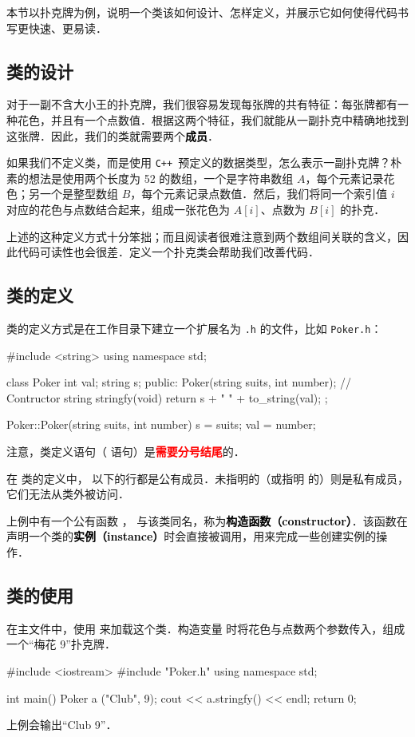 \documentclass[a4paper, zihao=-4, linespread=1]{ctexrep}
\newcommand\cpp{\texttt{C++}}
\newcommand\hlt[1]{\textcolor{red}{\bfseries #1}}
\newcommand\cppkw[1]{\textcolor{black}{\bfseries #1}}
\begin{document}
本节以扑克牌为例，说明一个类该如何设计、怎样定义，并展示它如何使得代码书写更快速、更易读．

\subsection{类的设计}
对于一副不含大小王的扑克牌，我们很容易发现每张牌的共有特征：每张牌都有一种花色，并且有一个点数值．根据这两个特征，我们就能从一副扑克中精确地找到这张牌．因此，我们的类就需要两个\cppkw{成员}．

如果我们不定义类，而是使用 \cpp\ 预定义的数据类型，怎么表示一副扑克牌？朴素的想法是使用两个长度为 52 的数组，一个是字符串数组 $A$，每个元素记录花色；另一个是整型数组 $B$，每个元素记录点数值．然后，我们将同一个索引值 $i$ 对应的花色与点数结合起来，组成一张花色为 $A[i]$、点数为 $B[i]$ 的扑克．

上述的这种定义方式十分笨拙；而且阅读者很难注意到两个数组间关联的含义，因此代码可读性也会很差．定义一个扑克类会帮助我们改善代码．

\subsection{类的定义}
类的定义方式是在工作目录下建立一个扩展名为 \texttt{.h} 的文件，比如 \texttt{Poker.h}：
\begin{cpplang}
#include <string>
using namespace std;

class Poker {
    int val;
    string s;
public:
    Poker(string suits, int number);  // Contructor
    string stringfy(void) {
        return s + " " + to_string(val);
    }
};

Poker::Poker(string suits, int number) {
    s = suits;
    val = number;
}
\end{cpplang}
注意，类定义语句（ 语句）是\hlt{需要分号结尾}的．

在  类的定义中， 以下的行都是公有成员．未指明的（或指明  的）则是私有成员，它们无法从类外被访问．

上例中有一个公有函数 ， 与该类同名，称为\cppkw{构造函数（constructor）}．该函数在声明一个类的\cppkw{实例（instance）}时会直接被调用，用来完成一些创建实例的操作．

\subsection{类的使用}
在主文件中，使用  来加载这个类．构造变量  时将花色与点数两个参数传入，组成一个“梅花 9”扑克牌．
\begin{cpplang}
#include <iostream>
#include "Poker.h"
using namespace std;

int main() {
    Poker a ("Club", 9);
    cout << a.stringfy() << endl;
    return 0;
}
\end{cpplang}
上例会输出“Club 9”．
\end{document}

